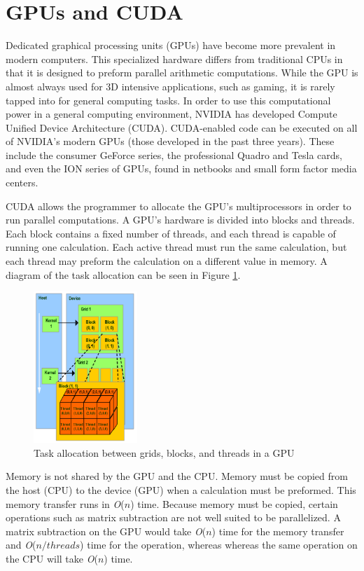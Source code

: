 \documentclass[10pt,twocolumn,twoside]{IEEEtran}
\renewcommand{\O}[1]{\textit{O}(\ensuremath{#1})}
\begin{document}
\section{GPUs and CUDA}
Dedicated graphical processing units (GPUs) have become more prevalent in modern computers. This specialized hardware differs from traditional CPUs in that it is designed to preform parallel arithmetic computations. While the GPU is almost always used for 3D intensive applications, such as gaming, it is rarely tapped into for general computing tasks. In order to use this computational power in a general computing environment, NVIDIA has developed Compute Unified Device Architecture (CUDA). CUDA-enabled code can be executed on all of NVIDIA's modern GPUs (those developed in the past three years). These include the consumer GeForce series, the professional Quadro and Tesla cards, and even the ION series of GPUs, found in netbooks and small form factor media centers.
	
CUDA allows the programmer to allocate the GPU's multiprocessors in order to run parallel computations. A GPU's hardware is divided into blocks and threads. Each block contains a fixed number of threads, and each thread is capable of running one calculation. Each active thread must run the same calculation, but each thread may preform the calculation on a different value in memory. A diagram of the task allocation can be seen in Figure \ref{fig:cudaBlocks}.

\begin{figure}[h]
\begin{center}
\includegraphics[width=0.35\textwidth]{Images/cudaBlocks.png}
\caption{Task allocation between grids, blocks, and threads in a GPU}
\label{fig:cudaBlocks}
\end{center}
\end{figure}
	
Memory is not shared by the GPU and the CPU. Memory must be copied from the host (CPU) to the device (GPU) when a calculation must be preformed. This memory transfer runs in \O{n} time. Because memory must be copied, certain operations such as matrix subtraction are not well suited to be parallelized. A matrix subtraction on the GPU would take \O{n} time for the memory transfer and \O{n/threads} time for the operation, whereas whereas the same operation on the CPU will take \O{n} time.
\end{document}
